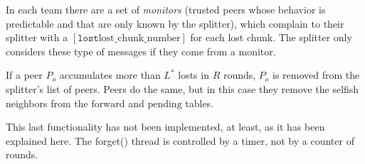 
\label{sec:free_riding_control}

In each team there are a set of \emph{monitors} (trusted peers whose
behavior is predictable and that are only known by the splitter),
which complain to their splitter with a $[\mathtt{lost}
  \text{lost\_chunk\_number}]$ for each lost chunk. The splitter only
considers these type of messages if they come from a monitor.

If a peer $P_o$ accumulates more than $L^*$ losts in $R$ rounds, $P_o$
is removed from the splitter's list of peers. Peers do the same, but
in this case they remove the selfish neighbors from the
$\text{forward}$ and $\text{pending}$ tables.


\begin{notex}
This last functionality has not been implemented, at least, as it has
been explained here. The forget() thread is controlled by a timer, not
by a counter of rounds.
\end{notex}

